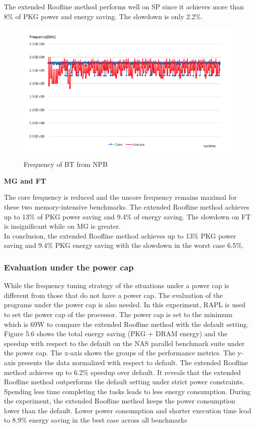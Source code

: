 The extended Roofline method performs well on SP since it achieves more than 8\% of PKG power and energy saving. The slowdown is only 2.2\%. 


\begin{figure} [h] %
	\centering   %
	\includegraphics[width=12cm]{pictures/bt_fcuc}
	\caption{Frequency of BT from NPB}
\end{figure}

\textbf{MG and FT}

The core frequency is reduced and the uncore frequency remains maximal for these two memory-intensive benchmarks. The extended Roofline method achieves up to 13\% of PKG power saving and 9.4\% of energy saving. The slowdown on FT is insignificant while on MG is greater. \\

In conclusion, the extended Roofline method achieves up to 13\% PKG power saving and 9.4\% PKG energy saving with the slowdown in the worst case 6.5\%.

\subsubsection{Evaluation under the power cap}

While the frequency tuning strategy of the situations under a power cap is different from those that do not have a power cap. The evaluation of the programs under the power cap is also needed. In this experiment, RAPL is used to set the power cap of the processor. The power cap is set to the minimum which is 69W to compare the extended Roofline method with the default setting. Figure 5.6 shows the total energy saving (PKG + DRAM energy) and the speedup with respect to the default on the NAS parallel benchmark suite under the power cap. The x-axis shows the groups of the performance metrics. The y-axis presents the data normalized with respect to default. The extended Roofline method achieves up to 6.2\% speedup over default. It reveals that the extended Roofline method outperforms the default setting under strict power constraints. Spending less time completing the tasks leads to less energy consumption. During the experiment, the extended Roofline method keeps the power consumption lower than the default. Lower power consumption and shorter execution time lead to 8.9\% energy saving in the best case across all benchmarks

